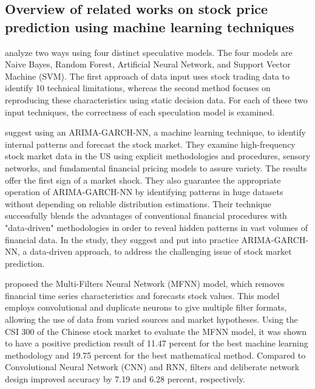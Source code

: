 \documentclass[a4paper]{article}
\begin{document}
\subsection{Overview of related works on stock price prediction using machine learning techniques}


\textbf{\cite{patel2015predicting}} analyze two ways using four distinct speculative models. The four models are Naive Bayes, Random Forest, Artificial Neural Network, and  Support Vector Machine (SVM). The first approach of data input uses stock trading data to identify 10 technical limitations, whereas the second method focuses on reproducing these characteristics using static decision data. For each of these two input techniques, the correctness of each speculation model is examined.

\textbf{\cite{sun2019exploiting}} suggest using an ARIMA-GARCH-NN, a machine learning technique, to identify internal patterns and forecast the stock market. They examine high-frequency stock market data in the US using explicit methodologies and procedures, sensory networks, and fundamental financial pricing models to assure variety. The results offer the first sign of a market shock. They also guarantee the appropriate operation of ARIMA-GARCH-NN by identifying patterns in huge datasets without depending on reliable distribution estimations. Their technique successfully blends the advantages of conventional financial procedures with "data-driven" methodologies in order to reveal hidden patterns in vast volumes of financial data. In the study, they suggest and put into practice ARIMA-GARCH-NN, a data-driven approach, to address the challenging issue of stock market prediction.

\textbf{\cite{long2019deep}} proposed the Multi-Filters Neural Network (MFNN) model, which removes financial time series characteristics and forecasts stock values. This model employs convolutional and duplicate neurons to give multiple filter formats, allowing the use of data from varied sources and market hypotheses. Using the CSI 300 of the Chinese stock market to evaluate the MFNN model, it was shown to have a positive prediction result of 11.47 percent for the best machine learning methodology and 19.75 percent for the best mathematical method. Compared to Convolutional Neural Network (CNN) and RNN, filters and deliberate network design improved accuracy by 7.19 and 6.28 percent, respectively.
\end{document}
